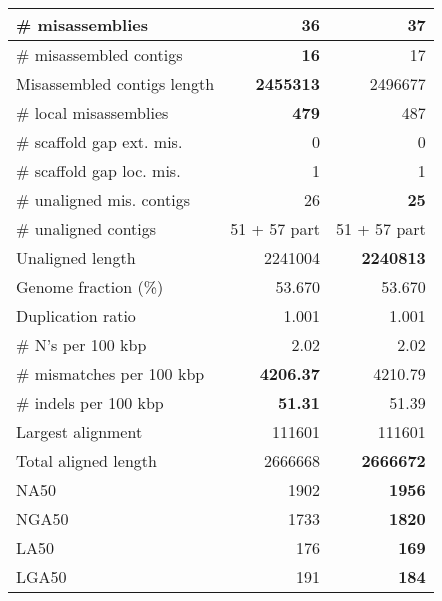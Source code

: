 \documentclass[12pt,a4paper]{article}
\begin{document}
\begin{table}[ht]
\begin{center}
\begin{tabular}{|l*{2}{|r}|}
\# misassemblies & {\bf 36} & 37 \\ \hline
\# misassembled contigs & {\bf 16} & 17 \\ \hline
Misassembled contigs length & {\bf 2455313} & 2496677 \\ \hline
\# local misassemblies & {\bf 479} & 487 \\ \hline
\# scaffold gap ext. mis. & 0 & 0 \\ \hline
\# scaffold gap loc. mis. & 1 & 1 \\ \hline
\# unaligned mis. contigs & 26 & {\bf 25} \\ \hline
\# unaligned contigs & 51 + 57 part & 51 + 57 part \\ \hline
Unaligned length & 2241004 & {\bf 2240813} \\ \hline
Genome fraction (\%) & 53.670 & 53.670 \\ \hline
Duplication ratio & 1.001 & 1.001 \\ \hline
\# N's per 100 kbp & 2.02 & 2.02 \\ \hline
\# mismatches per 100 kbp & {\bf 4206.37} & 4210.79 \\ \hline
\# indels per 100 kbp & {\bf 51.31} & 51.39 \\ \hline
Largest alignment & 111601 & 111601 \\ \hline
Total aligned length & 2666668 & {\bf 2666672} \\ \hline
NA50 & 1902 & {\bf 1956} \\ \hline
NGA50 & 1733 & {\bf 1820} \\ \hline
LA50 & 176 & {\bf 169} \\ \hline
LGA50 & 191 & {\bf 184} \\ \hline
\end{tabular}
\end{center}
\end{table}
\end{document}
